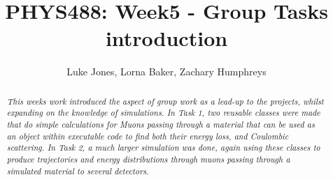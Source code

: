 \documentclass[twocolumn]{article}
\title{PHYS488: Week5 - Group Tasks introduction}
\author{Luke Jones, Lorna Baker, Zachary Humphreys}
\begin{document}
	
\maketitle
\begin{abstract}
	\begin{center}
		\textit{This weeks work introduced the aspect of group work as a lead-up to the projects, whilst expanding on the knowledge of simulations. In Task 1, two reusable classes were made that do simple calculations for Muons passing through a material that can be used as an object within executable code to find both their energy loss, and Coulombic scattering. In Task 2, a much larger simulation was done, again using these classes to produce trajectories and energy distributions through muons passing through a simulated material to several detectors.}
	\end{center}
\end{abstract}	
\end{document}
